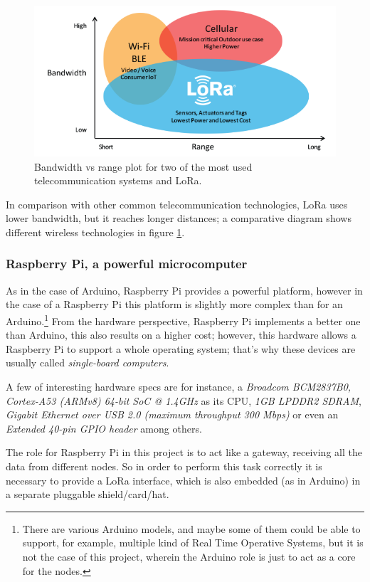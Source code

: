 \documentclass[11pt,a4paper,dvipsnames,twoside]{article}
\begin{document}
\begin{figure}[htp]
  \centering
  \includegraphics[width=.9\textwidth]{../pictures/LoRa_Why_Range.png}
  \caption{Bandwidth vs range plot for two of the most used telecommunication systems and LoRa.}
  \label{fig:LoraComparison}
\end{figure}

In comparison with other common telecommunication technologies, LoRa uses lower bandwidth, but it reaches longer distances; a comparative diagram shows different wireless technologies in figure \ref{fig:LoraComparison}.
 
\subsubsection{Raspberry Pi, a powerful microcomputer}
As in the case of Arduino, Raspberry Pi provides a powerful platform, however in the case of a Raspberry Pi this platform is slightly more complex than for an Arduino.\footnote{There are various Arduino models, and maybe some of them could be able to support, for example, multiple kind of Real Time Operative Systems, but it is not the case of this project, wherein the Arduino role is just to act as a core for the nodes.} From the hardware perspective, Raspberry Pi implements a better one than Arduino, this also results on a higher cost; however, this hardware allows a Raspberry Pi to support a whole operating system; that's why these devices are usually called \textit{single-board computers}.

A few of interesting hardware specs are for instance, a \textit{Broadcom BCM2837B0, Cortex-A53 (ARMv8) 64-bit SoC @ 1.4GHz} as its CPU, \textit{1GB LPDDR2 SDRAM}, \textit{Gigabit Ethernet over USB 2.0 (maximum throughput 300 Mbps)} or even an \textit{Extended 40-pin GPIO header} among others.\cite{RPiSpecs}

The role for Raspberry Pi in this project is to act like a gateway, receiving all the data from different nodes. So in order to perform this task correctly it is necessary to provide a LoRa interface, which is also embedded (as in Arduino) in a separate pluggable shield/card/hat.
\end{document}
